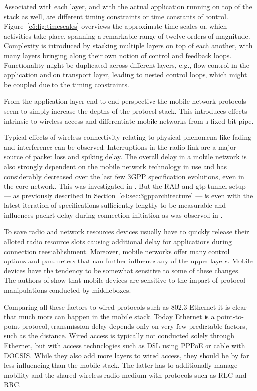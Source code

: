 Associated with each layer, and with the actual application running on top of the stack as well, are different timing constraints or time constants of control. Figure~\ref{c5:fig:timescales} overviews the approximate time scales on which activities take place, spanning a remarkable range of twelve orders of magnitude. Complexity is introduced by stacking multiple layers on top of each another, with many layers bringing along their own notion of control and feedback loops. Functionality might be duplicated across different layers, e.g., flow control in the application and on transport layer, leading to nested control loops, which might be coupled due to the timing constraints.

From the application layer end-to-end perspective the mobile network protocols seem to simply increase the depths of the protocol stack. This introduces effects intrinsic to wireless access and differentiate mobile networks from a fixed bit pipe.

Typical effects of wireless connectivity relating to physical phenomena like fading and interference can be observed. Interruptions in the radio link are a major source of packet loss and spiking delay. The overall delay in a mobile network is also strongly dependent on the mobile network technology in use and has considerably decreased over the last few \gls{3GPP} specification evolutions, even in the core network. This was investigated in \cite{laner2011dissecting3gdelay}. But the \gls{RAB} and \gls{gtp} tunnel setup --- as previously described in Section~\ref{c4:sec:3gpparchitecture} --- is even with the latest iteration of specifications sufficiently lengthy to be measurable and influences packet delay during connection initiation as was observed in \cite{arlos2010packetsizedelayinfluence}.

To save radio and network resources devices usually have to quickly release their alloted radio resource slots causing additional delay for applications during connection reestablishment. Moreover, mobile networks offer many control options and parameters that can further influence any of the upper layers. Mobile devices have the tendency to be somewhat sensitive to some of these changes. The authors of \cite{sigcomm11middleboxes} show that mobile devices are sensitive to the impact of protocol manipulations conducted by middleboxes. 

Comparing all these factors to wired protocols such as 802.3 Ethernet it is clear that much more can happen in the mobile stack. Today Ethernet is a point-to-point protocol, transmission delay depends only on very few predictable factors, such as the distance. Wired access is typically not conducted solely through Ethernet, but with access technologies such as \gls{DSL} using \gls{PPPoE} or cable with \gls{DOCSIS}. While they also add more layers to wired access, they should be by far less influencing than the mobile stack. The latter has to additionally manage mobility and the shared wireless radio medium with protocols such as \gls{RLC} and \gls{RRC}.

